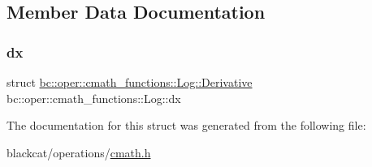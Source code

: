 \subsection{Member Data Documentation}
\mbox{\label{structbc_1_1oper_1_1cmath__functions_1_1Log_aa46b349732849baddfc44006ecbbec27}} 
\subsubsection{\texorpdfstring{dx}{dx}}
{\footnotesize\ttfamily struct \hyperlink{structbc_1_1oper_1_1cmath__functions_1_1Log_1_1Derivative}{bc\+::oper\+::cmath\+\_\+functions\+::\+Log\+::\+Derivative}   bc\+::oper\+::cmath\+\_\+functions\+::\+Log\+::dx}



The documentation for this struct was generated from the following file\+:\begin{DoxyCompactItemize}
\item 
blackcat/operations/\hyperlink{cmath_8h}{cmath.\+h}\end{DoxyCompactItemize}
